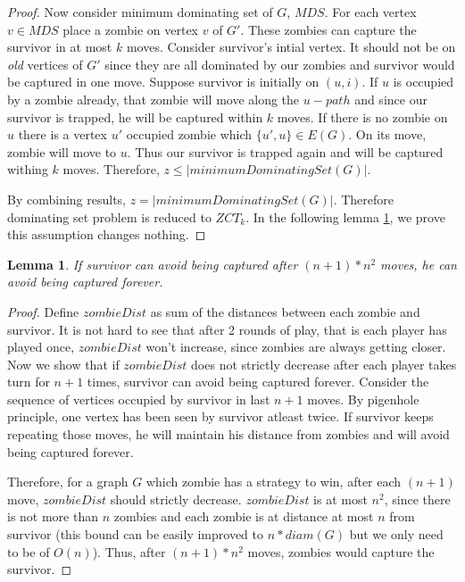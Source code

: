 \documentclass[1p]{elsarticle}
\newtheorem{lemma}[theorem]{Lemma}
\begin{document}
\begin{proof}
		Now consider minimum dominating set of $G$, $MDS$. For each vertex $v \in MDS$ place a zombie on vertex $v$
		of $G'$. These zombies can capture the survivor in at most $k$ moves. Consider survivor's intial vertex. It
		should not be on {\it old} vertices of $G'$ since they are all dominated by our zombies and survivor would be
		captured in one move. Suppose survivor is initially on $(u,i)$. If $u$ is occupied by a zombie already, that
		zombie will move along the $u-path$ and since our survivor is trapped, he will be captured within $k$ moves. If
		there is no zombie on $u$ there is a vertex $u'$ occupied zombie which $ \{u',u\} \in E(G)$. On its move, zombie
		will move to $u$. Thus our survivor is trapped again and will be captured withing $k$ moves. Therefore, $z \leq
		|minimumDominatingSet(G)|$.

		By combining results, $z = |minimumDominatingSet(G)|$. Therefore dominating set problem is reduced to $ZCT_k$.
		In the following lemma \ref{limit-moves}, we prove this assumption changes nothing.

	\end{proof}

	\begin{lemma}
		\label{limit-moves}
		If survivor can avoid being captured after $(n + 1) * n^2$ moves, he can avoid being captured forever.
	\end{lemma}
	\begin{proof}
		Define $zombieDist$ as sum of the distances between each zombie and survivor. It is not hard to see that after 2
		rounds of play, that is each player has played once, $zombieDist$ won't increase, since zombies are always
		getting closer. Now we show that if $zombieDist$ does not strictly decrease after each player takes turn for $n
		+ 1$ times, survivor can avoid being captured forever. Consider the sequence of vertices occupied by survivor in
		last $n + 1$ moves. By pigenhole principle, one vertex has been seen by survivor atleast twice. If survivor keeps
		repeating those moves, he will maintain his distance from zombies and will avoid being captured forever.

		Therefore, for a graph $G$ which zombie has a strategy to win, after each $(n + 1)$ move, $zombieDist$ should
		strictly decrease. $zombieDist$ is at most $n^2$, since there is not more than $n$ zombies and each zombie is at
		distance at most $n$ from survivor (this bound can be easily improved to $n * diam(G)$ but we only need to be of
		$O(n)$). Thus, after $(n + 1) * n^2$ moves, zombies would capture the survivor.
	\end{proof}
\end{document}
